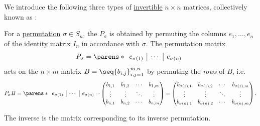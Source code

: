 \begin{definition}\label{def:elementary_matrix}
  We introduce the following three types of \hyperref[def:inverse_matrix]{invertible} \( n \times n \) matrices, collectively known as :
  \begin{thmenum}
     For a \hyperref[def:symmetric_group]{permutation} \( \sigma \in S_n \), the  \( P_\sigma \) is obtained by permuting the columns \( e_1, \ldots, e_n \) of the identity matrix \( I_n \) in accordance with \( \sigma \). The permutation matrix
    \begin{equation*}
      P_\sigma = \parens*
      {
        \begin{array}{c|c|c}
          e_{\sigma(1)} & \cdots & e_{\sigma(n)}
        \end{array}
      }
    \end{equation*}
    acts on the \( n \times m \) matrix \( B = \seq{ b_{i,j} }_{i,j=1}^{m,n} \) by permuting the \emph{rows} of \( B \), i.e.
    \begin{equation*}
      P_\sigma B
      =
      \parens*
      {
        \begin{array}{c|c|c}
          e_{\sigma(1)} & \cdots & e_{\sigma(n)}
        \end{array}
      }
      \cdot
      \begin{pmatrix}
        b_{1,1} & b_{1,2} & \cdots & b_{1,m} \\
        \vdots  & \vdots  & \ddots & \vdots \\
        b_{n,1} & b_{n,2} & \cdots & b_{n,m}
      \end{pmatrix}
      =
      \begin{pmatrix}
        b_{\sigma(1),1} & b_{\sigma(1),2} & \cdots & b_{\sigma(1),m} \\
        \vdots          & \vdots          & \ddots & \vdots \\
        b_{\sigma(n),1} & b_{\sigma(n),2} & \cdots & b_{\sigma(n),m}
      \end{pmatrix}.
    \end{equation*}

    The inverse is the matrix corresponding to its inverse permutation.


\end{thmenum}
\end{definition}
